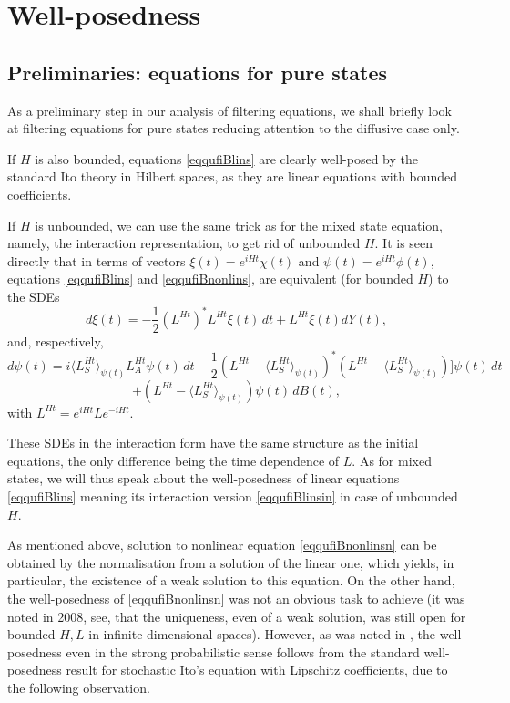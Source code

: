\documentclass[12pt]{article}
\begin{document}
\section{Well-posedness}
\label{secwellpos}

\subsection{Preliminaries: equations for pure states}

As a preliminary step in our analysis of filtering equations, we shall briefly look at
filtering equations for pure states reducing attention to the diffusive case only.

If $H$ is also bounded,
equations \eqref{eqqufiBlins} are clearly well-posed by the standard Ito theory
in Hilbert spaces, as they are
linear equations with bounded coefficients.

If $H$ is unbounded, we can use the same trick as for the mixed state equation,
namely, the interaction representation, to get rid of unbounded $H$.
It is seen directly that in terms of vectors
$\xi(t)=e^{iHt} \chi(t)$ and $\psi(t)=e^{iHt} \phi(t)$,
equations \eqref{eqqufiBlins} and \eqref{eqqufiBnonlins},
are equivalent (for bounded $H$) to the SDEs
\begin{equation}
\label{eqqufiBlinsin}
d\xi(t) = -\frac12 (L^{Ht})^*L^{Ht} \xi(t) \,dt+L^{Ht} \xi(t) dY(t),
\end{equation}
and, respectively,
\[
d\psi(t)= i\langle L^{Ht}_S \rangle_{\psi(t)} L^{Ht}_A \psi(t) \, dt
-\frac12 (L^{Ht}-\langle L^{Ht}_S \rangle_{\psi(t)})^*(L^{Ht}-\langle L^{Ht}_S \rangle_{\psi(t)})]\psi(t) \, dt
\]
\begin{equation}
\label{eqqufiBnonlinsin}
+ (L^{Ht}-\langle L^{Ht}_S \rangle_{\psi(t)})\psi(t) \, dB(t),
\end{equation}
with $L^{Ht}=e^{iHt} L e^{-iHt}$.

These SDEs in the interaction form have the same structure as the initial equations, the only difference being
the time dependence of $L$. As for mixed states,
we will thus speak about the well-posedness of linear equations \eqref{eqqufiBlins} meaning its interaction version
\eqref{eqqufiBlinsin} in case of unbounded $H$.

As mentioned above, solution to nonlinear equation  \eqref{eqqufiBnonlinsn} can be obtained by the normalisation
  from a solution of the linear one, which yields, in particular, the existence of a weak solution to this equation.
  On the other hand, the well-posedness of  \eqref{eqqufiBnonlinsn}  was not an obvious task to achieve
  (it was noted in 2008, see\cite{MoraRebo}, that the uniqueness, even of a weak solution,
was still open for bounded $H,L$ in infinite-dimensional spaces). However, as was noted in \cite{KolQuantLLN},
the  well-posedness even in the strong probabilistic sense follows from the standard well-posedness result
  for stochastic Ito's equation with Lipschitz coefficients, due to
  the following observation.
\end{document}
